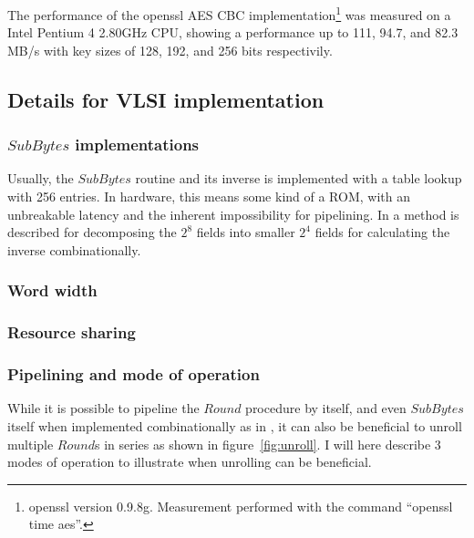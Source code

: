 The performance of the openssl AES CBC implementation\footnote{openssl
  version 0.9.8g. Measurement performed with the command ``openssl
  time aes''.} was measured on a Intel Pentium 4 2.80GHz CPU, showing
a performance up to 111, 94.7, and 82.3 MB/s with key sizes of 128,
192, and 256 bits respectivily.


\subsection{Details for VLSI implementation}

\subsubsection{$SubBytes$ implementations}

Usually, the $SubBytes$ routine and its inverse is implemented with a
table lookup with 256 entries. In hardware, this means some kind of a
ROM, with an unbreakable latency and the inherent impossibility for
pipelining. In \cite{csbox} a method is described for decomposing the
$2^8$ fields into smaller $2^4$ fields for calculating the inverse
combinationally.

\subsubsection{Word width}

\subsubsection{Resource sharing}

\subsubsection{Pipelining and mode of operation}

While it is possible to pipeline the $Round$ procedure by itself, and
even $SubBytes$ itself when implemented combinationally as in
\cite{csbox}, it can also be beneficial to unroll multiple $Round$s in
series as shown in figure~\ref{fig:unroll}. I will here describe 3
modes of operation to illustrate when unrolling can be beneficial.

